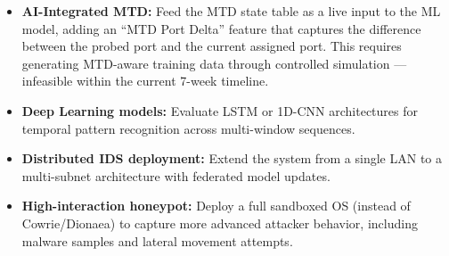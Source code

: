 \documentclass[12pt,a4paper]{article}
\begin{document}
\begin{itemize}[nosep,leftmargin=1.5em]
  \item \textbf{AI-Integrated MTD:} Feed the MTD state table as a live input
        to the ML model, adding an ``MTD Port Delta'' feature that captures the
        difference between the probed port and the current assigned port. This
        requires generating MTD-aware training data through controlled
        simulation --- infeasible within the current 7-week timeline.
  \item \textbf{Deep Learning models:} Evaluate LSTM or 1D-CNN architectures
        for temporal pattern recognition across multi-window sequences.
  \item \textbf{Distributed IDS deployment:} Extend the system from a single
        LAN to a multi-subnet architecture with federated model updates.
  \item \textbf{High-interaction honeypot:} Deploy a full sandboxed OS
        (instead of Cowrie/Dionaea) to capture more advanced attacker behavior,
        including malware samples and lateral movement attempts.
\end{itemize}
\end{document}
